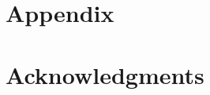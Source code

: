 \documentclass[english,12pt]{report}
\begin{document}
\begin{spacing}{1.5}
\chapter{Appendix}





\chapter*{Acknowledgments}










\end{spacing}
\end{document}
